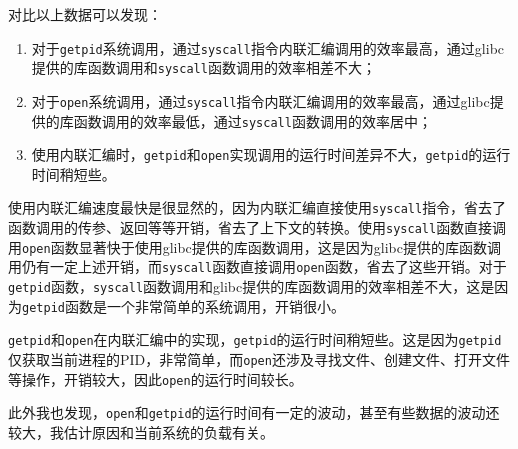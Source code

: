 \documentclass[UTF8]{article}
\begin{document}
对比以上数据可以发现：
\begin{enumerate}
    \item 对于\texttt{getpid}系统调用，通过\texttt{syscall}指令内联汇编调用的效率最高，通过glibc提供的库函数调用和\texttt{syscall}函数调用的效率相差不大；
    \item 对于\texttt{open}系统调用，通过\texttt{syscall}指令内联汇编调用的效率最高，通过glibc提供的库函数调用的效率最低，通过\texttt{syscall}函数调用的效率居中；
    \item 使用内联汇编时，\texttt{getpid}和\texttt{open}实现调用的运行时间差异不大，\texttt{getpid}的运行时间稍短些。
\end{enumerate}

使用内联汇编速度最快是很显然的，因为内联汇编直接使用\texttt{syscall}指令，省去了函数调用的传参、返回等等开销，省去了上下文的转换。使用\texttt{syscall}函数直接调用\texttt{open}函数显著快于使用glibc提供的库函数调用，这是因为glibc提供的库函数调用仍有一定上述开销，而\texttt{syscall}函数直接调用\texttt{open}函数，省去了这些开销。对于\texttt{getpid}函数，\texttt{syscall}函数调用和glibc提供的库函数调用的效率相差不大，这是因为\texttt{getpid}函数是一个非常简单的系统调用，开销很小。

\texttt{getpid}和\texttt{open}在内联汇编中的实现，\texttt{getpid}的运行时间稍短些。这是因为\texttt{getpid}仅获取当前进程的PID，非常简单，而\texttt{open}还涉及寻找文件、创建文件、打开文件等操作，开销较大，因此\texttt{open}的运行时间较长。

此外我也发现，\texttt{open}和\texttt{getpid}的运行时间有一定的波动，甚至有些数据的波动还较大，我估计原因和当前系统的负载有关。
\end{document}
